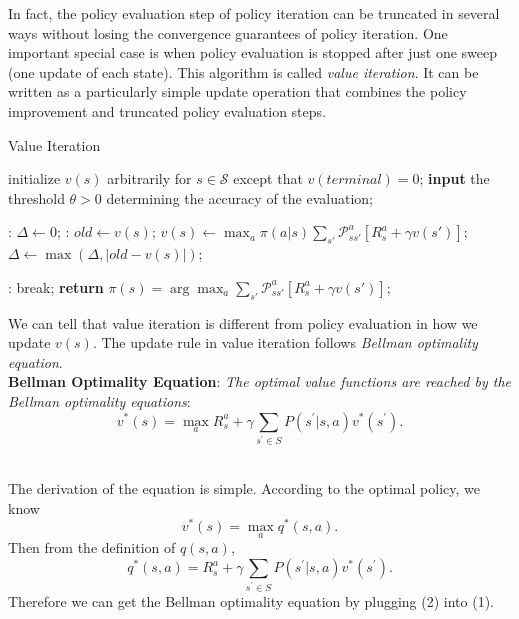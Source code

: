 \documentclass{progartcn}
\begin{document}
			In fact, the policy evaluation step of policy iteration can be truncated in several ways without losing the convergence guarantees of policy iteration. One important special case is when policy evaluation is stopped after just one sweep (one update of each state). This algorithm is called \textit{value iteration}. It can be written as a particularly simple update operation that combines the policy improvement and truncated policy evaluation steps.

			\begin{algorithm}[H]
			\caption{Value Iteration}
			\label{alg: Value Iteration}
			\begin{algorithmic}[1]
			\State initialize $v(s)$ arbitrarily for $s\in\mathcal{S}$ except that $v(terminal)=0$;
            \State \textbf{input} the threshold $\theta>0$ determining the accuracy of the evaluation; 
            
            :
            	\State $\Delta\gets 0$;
            	:
            		\State $old\gets v(s)$;
            		\State $v(s)\gets\max_{a}\pi(a|s)\sum_{s'}\mathcal{P}_{ss'}^a[R_s^a+\gamma v(s')]$;
            		\State $\Delta\gets\max(\Delta,|old-v(s)|)$;
            	\EndFor

            	\If {$\Delta<\theta$}:
            	\State break;
            	\EndIf
            \EndFor
            \State \textbf{return} $\pi(s)=\arg\max_a\sum_{s'}\mathcal{P}_{ss'}^a[R_s^a+\gamma v(s')]$;
            \end{algorithmic}
            \end{algorithm}

            We can tell that value iteration is different from policy evaluation in how we update $v(s)$. The update rule in value iteration follows \textit{Bellman optimality equation}.\\

			\textbf{Bellman Optimality Equation}: \textit{The optimal value functions are reached by the Bellman optimality equations}:
			\[v^{*}(s)=\max _{a} R_s^a+\gamma \sum_{s^{\prime} \in S} P\left(s^{\prime} | s, a\right) v^{*}\left(s^{\prime}\right).\]\

			The derivation of the equation is simple. According to the optimal policy, we know
			\[v^{*}(s)=\max_a q^{*}(s, a)\tag{1}.\]
			Then from the definition of $q(s,a)$,
			\[q^{*}(s, a)=R_s^a+\gamma \sum_{s^{\prime} \in S} P\left(s^{\prime} | s, a\right) v^{*}\left(s^{\prime}\right).\tag{2}\]
			Therefore we can get the Bellman optimality equation by plugging (2) into (1).\\
\end{document}
